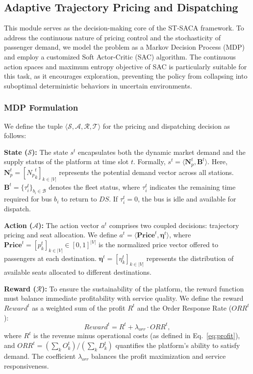 \documentclass[lettersize,journal]{IEEEtran}
\begin{document}
\subsection{Adaptive Trajectory Pricing and Dispatching}
\label{sec:sac}

This module serves as the decision-making core of the ST-SACA framework. To address the continuous nature of pricing control and the stochasticity of passenger demand, we model the problem as a Markov Decision Process (MDP) and employ a customized Soft Actor-Critic (SAC) algorithm. The continuous action spaces and maximum entropy objective of SAC is particularly suitable for this task, as it encourages exploration, preventing the policy from collapsing into suboptimal deterministic behaviors in uncertain environments.

\subsubsection{MDP Formulation}
We define the tuple $\langle \mathcal{S}, \mathcal{A}, \mathcal{R}, \mathcal{T} \rangle$ for the pricing and dispatching decision as follows:

\textbf{State ($\mathcal{S}$):} 
The state $s^t$ encapsulates both the dynamic market demand and the supply status of the platform at time slot $t$. Formally, $s^t = \langle \mathbf{N}_p^t, \mathbf{B}^t \rangle$. 
Here, $\mathbf{N}_p^t = [{N_p}^t_k]_{k \in |V|}$ represents the potential demand vector across all stations. 
$\mathbf{B}^t=\{\tau_i^t\}_{b_i \in \mathcal{B}}$ denotes the fleet status, where $\tau_i^t$ indicates the remaining time required for bus $b_i$ to return to $DS$. If $\tau_i^t = 0$, the bus is idle and available for dispatch.

\textbf{Action ($\mathcal{A}$):} 
The action vector $a^t$ comprises two coupled decisions: trajectory pricing and seat allocation. We define $a^t = \langle \mathbf{Price}^t, \boldsymbol{\eta}^t \rangle$, where $\mathbf{Price}^t = [p^t_k]_{k \in |V|} \in [0, 1]^{|V|}$ is the normalized price vector offered to passengers at each destination. $\boldsymbol{\eta}^t = [\eta^t_k]_{k \in |V|}$ represents the distribution of available seats allocated to different destinations.

\textbf{Reward ($\mathcal{R}$):} 
To ensure the sustainability of the platform, the reward function must balance immediate profitability with service quality. We define the reward $Reward^t$ as a weighted sum of the profit $R^t$ and the Order Response Rate ($ORR^t$):
\begin{equation}
    Reward^t = R^t + \lambda_{orr} \cdot ORR^t,
\end{equation}
where $R^t$ is the revenue minus operational costs (as defined in Eq.~\eqref{eq:profit}), and $ORR^t = (\sum_k O^t_k) / (\sum_k D^t_k)$ quantifies the platform's ability to satisfy demand. The coefficient $\lambda_{orr}$ balances the profit maximization and service responsiveness.
\end{document}
